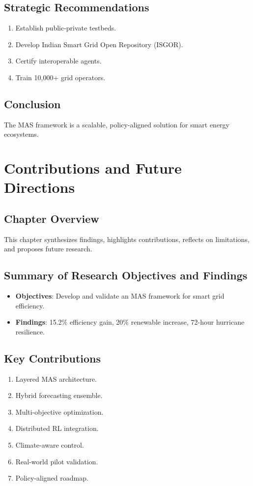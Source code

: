 \documentclass[12pt, a4paper, oneside]{book}
\begin{document}
\section{Strategic Recommendations}
\begin{enumerate}
    \item Establish public-private testbeds.
    \item Develop Indian Smart Grid Open Repository (ISGOR).
    \item Certify interoperable agents.
    \item Train 10,000+ grid operators.
\end{enumerate}

\section{Conclusion}
The MAS framework is a scalable, policy-aligned solution for smart energy ecosystems.

\chapter{Contributions and Future Directions}
\section{Chapter Overview}
This chapter synthesizes findings, highlights contributions, reflects on limitations, and proposes future research.

\section{Summary of Research Objectives and Findings}
\begin{itemize}
    \item \textbf{Objectives}: Develop and validate an MAS framework for smart grid efficiency.
    \item \textbf{Findings}: 15.2\% efficiency gain, 20\% renewable increase, 72-hour hurricane resilience.
\end{itemize}

\section{Key Contributions}
\begin{enumerate}
    \item Layered MAS architecture.
    \item Hybrid forecasting ensemble.
    \item Multi-objective optimization.
    \item Distributed RL integration.
    \item Climate-aware control.
    \item Real-world pilot validation.
    \item Policy-aligned roadmap.
\end{enumerate}
\end{document}
